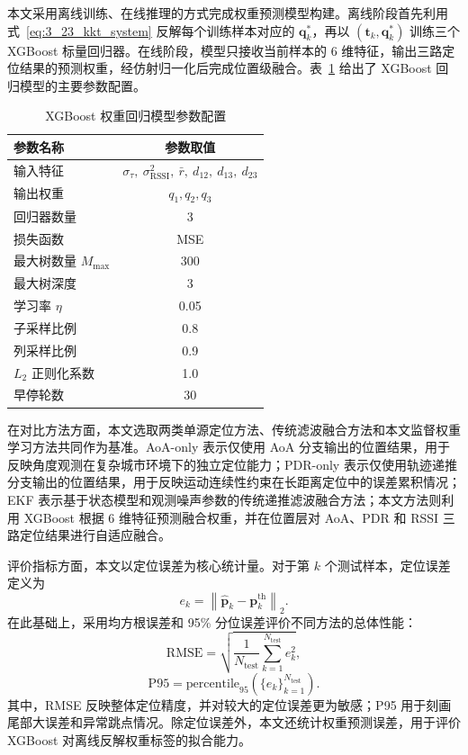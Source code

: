 本文采用离线训练、在线推理的方式完成权重预测模型构建。离线阶段首先利用式~\eqref{eq:3_23_kkt_system} 反解每个训练样本对应的 \(\mathbf{q}_k^\ast\)，再以 \((\mathbf{t}_k,\mathbf{q}_k^\ast)\) 训练三个 XGBoost 标量回归器。在线阶段，模型只接收当前样本的 6 维特征，输出三路定位结果的预测权重，经仿射归一化后完成位置级融合。表~\ref{tab:ch3_xgboost_parameter_setting} 给出了 XGBoost 回归模型的主要参数配置。

\begin{table}[htbp]
    \centering
    \caption{XGBoost 权重回归模型参数配置}
    \label{tab:ch3_xgboost_parameter_setting}
    \begin{tabular}{lc}
        \toprule
        \textbf{参数名称} & \textbf{参数取值} \\
        \midrule
        输入特征 & \(\sigma_{\tau},\ \sigma^2_{\mathrm{RSSI}},\ \bar r,\ d_{12},\ d_{13},\ d_{23}\) \\
        输出权重 & \(q_1, q_2, q_3\) \\
        回归器数量 & 3 \\
        损失函数 & MSE \\
        最大树数量 \(M_{\max}\) & 300 \\
        最大树深度 & 3 \\
        学习率 \(\eta\) & 0.05 \\
        子采样比例 & 0.8 \\
        列采样比例 & 0.9 \\
        \(L_2\) 正则化系数 & 1.0 \\
        早停轮数 & 30 \\
        \bottomrule
    \end{tabular}
\end{table}

在对比方法方面，本文选取两类单源定位方法、传统滤波融合方法和本文监督权重学习方法共同作为基准。AoA-only 表示仅使用 AoA 分支输出的位置结果，用于反映角度观测在复杂城市环境下的独立定位能力；PDR-only 表示仅使用轨迹递推分支输出的位置结果，用于反映运动连续性约束在长距离定位中的误差累积情况；EKF 表示基于状态模型和观测噪声参数的传统递推滤波融合方法；本文方法则利用 XGBoost 根据 6 维特征预测融合权重，并在位置层对 AoA、PDR 和 RSSI 三路定位结果进行自适应融合。

评价指标方面，本文以定位误差为核心统计量。对于第 \(k\) 个测试样本，定位误差定义为
\begin{equation}
e_k
=
\left\|
\hat{\mathbf{p}}_k-\mathbf{p}_k^{\mathrm{th}}
\right\|_2 .
\label{eq:3_44_position_error_metric}
\end{equation}
在此基础上，采用均方根误差和 95\% 分位误差评价不同方法的总体性能：
\begin{equation}
\mathrm{RMSE}
=
\sqrt{
\frac{1}{N_{\mathrm{test}}}
\sum_{k=1}^{N_{\mathrm{test}}}
 e_k^2
},
\label{eq:3_45_rmse_metric}
\end{equation}
\begin{equation}
\mathrm{P95}
=
\mathrm{percentile}_{95}
\left(
\{e_k\}_{k=1}^{N_{\mathrm{test}}}
\right).
\label{eq:3_46_p95_metric}
\end{equation}
其中，RMSE 反映整体定位精度，并对较大的定位误差更为敏感；P95 用于刻画尾部大误差和异常跳点情况。除定位误差外，本文还统计权重预测误差，用于评价 XGBoost 对离线反解权重标签的拟合能力。


